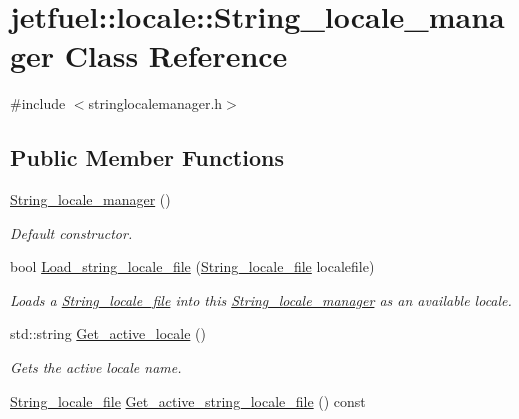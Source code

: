 \hypertarget{classjetfuel_1_1locale_1_1String__locale__manager}{}\section{jetfuel\+:\+:locale\+:\+:String\+\_\+locale\+\_\+manager Class Reference}
\label{classjetfuel_1_1locale_1_1String__locale__manager}


{\ttfamily \#include $<$stringlocalemanager.\+h$>$}

\subsection*{Public Member Functions}
\begin{DoxyCompactItemize}
\item 
\hyperlink{classjetfuel_1_1locale_1_1String__locale__manager_a347f49d477102a965dcbf288a79b403a}{String\+\_\+locale\+\_\+manager} ()
\begin{DoxyCompactList}\small\item\em Default constructor. \end{DoxyCompactList}\item 
bool \hyperlink{classjetfuel_1_1locale_1_1String__locale__manager_a2a972352f2b52a6aec947aad636ca6f1}{Load\+\_\+string\+\_\+locale\+\_\+file} (\hyperlink{classjetfuel_1_1locale_1_1String__locale__file}{String\+\_\+locale\+\_\+file} localefile)
\begin{DoxyCompactList}\small\item\em Loads a \hyperlink{classjetfuel_1_1locale_1_1String__locale__file}{String\+\_\+locale\+\_\+file} into this \hyperlink{classjetfuel_1_1locale_1_1String__locale__manager}{String\+\_\+locale\+\_\+manager} as an available locale. \end{DoxyCompactList}\item 
std\+::string \hyperlink{classjetfuel_1_1locale_1_1String__locale__manager_a41b25b50b804bce31184b32e6dc97fae}{Get\+\_\+active\+\_\+locale} ()
\begin{DoxyCompactList}\small\item\em Gets the active locale name. \end{DoxyCompactList}\item 
\hyperlink{classjetfuel_1_1locale_1_1String__locale__file}{String\+\_\+locale\+\_\+file} \hyperlink{classjetfuel_1_1locale_1_1String__locale__manager_af1984ab8c95bbfdf8211185a70b5ea4a}{Get\+\_\+active\+\_\+string\+\_\+locale\+\_\+file} () const

\end{DoxyCompactItemize}
